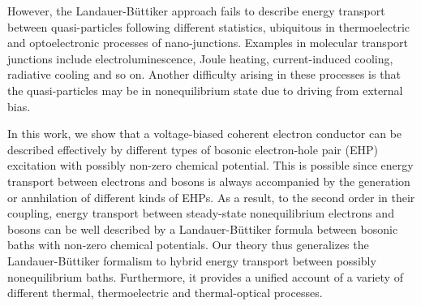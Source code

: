 \documentclass[aps
,twocolumn
,floatfix,footinbib,prl,longbibliography
]{revtex4-1}
\begin{document}

However, the Landauer-B\"uttiker approach fails to describe energy transport between quasi-particles following different statistics, ubiquitous in thermoelectric and optoelectronic processes of nano-junctions. Examples in molecular transport junctions include electroluminescence\cite{kuhnke2017atomic,galeprin2017photonics,schneider2010optical,schneider2012light}, Joule heating\cite{huang2007local,ioffe2008detection,lu_current-induced_2015,hartle2011resonant,hartle2011vibrational,hartle2018cooling}, current-induced cooling\cite{galperin2009cooling,simine2012vibrational,lykkebo2016single,hartle2011resonant}, radiative cooling\cite{zhu2019near} and so on. Another difficulty arising in these processes is that the quasi-particles may be in nonequilibrium state due to driving from external bias.

In this work, we show that a voltage-biased coherent electron conductor can be described effectively by different types of bosonic electron-hole pair (EHP) excitation with possibly non-zero chemical potential. 
This is possible since energy transport between electrons and bosons is always accompanied by the generation or annhilation of different kinds of EHPs\cite{headgordon_molecular_1995,dou2018perspective}.
As a result, to the second order in their coupling, energy transport between steady-state nonequilibrium electrons and bosons can be well described by a Landauer-B\"uttiker formula between bosonic baths with non-zero chemical potentials.  Our theory thus generalizes the Landauer-B\"uttiker formalism to hybrid energy transport between possibly nonequilibrium baths. Furthermore, it provides a unified account of a variety of different thermal, thermoelectric and thermal-optical processes.
\end{document}
